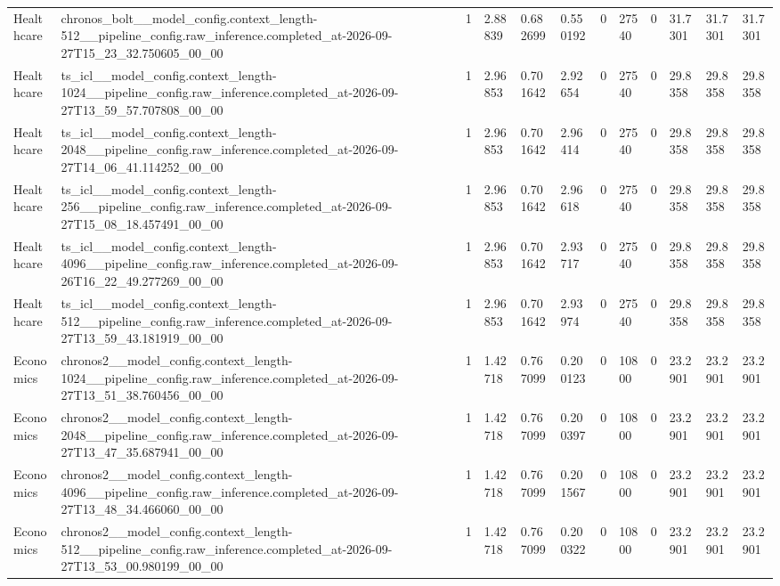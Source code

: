 \begin{tabular}{llllllllllll}
Healthcare & chronos\_bolt\_\_model\_config.context\_length-512\_\_pipeline\_config.raw\_inference.completed\_at-2026-09-27T15\_23\_32.750605\_00\_00 & 1 & 2.88839 & 0.682699 & 0.550192 & 0 & 27540 & 0 & 31.7301 & 31.7301 & 31.7301 \\
Healthcare & ts\_icl\_\_model\_config.context\_length-1024\_\_pipeline\_config.raw\_inference.completed\_at-2026-09-27T13\_59\_57.707808\_00\_00 & 1 & 2.96853 & 0.701642 & 2.92654 & 0 & 27540 & 0 & 29.8358 & 29.8358 & 29.8358 \\
Healthcare & ts\_icl\_\_model\_config.context\_length-2048\_\_pipeline\_config.raw\_inference.completed\_at-2026-09-27T14\_06\_41.114252\_00\_00 & 1 & 2.96853 & 0.701642 & 2.96414 & 0 & 27540 & 0 & 29.8358 & 29.8358 & 29.8358 \\
Healthcare & ts\_icl\_\_model\_config.context\_length-256\_\_pipeline\_config.raw\_inference.completed\_at-2026-09-27T15\_08\_18.457491\_00\_00 & 1 & 2.96853 & 0.701642 & 2.96618 & 0 & 27540 & 0 & 29.8358 & 29.8358 & 29.8358 \\
Healthcare & ts\_icl\_\_model\_config.context\_length-4096\_\_pipeline\_config.raw\_inference.completed\_at-2026-09-26T16\_22\_49.277269\_00\_00 & 1 & 2.96853 & 0.701642 & 2.93717 & 0 & 27540 & 0 & 29.8358 & 29.8358 & 29.8358 \\
Healthcare & ts\_icl\_\_model\_config.context\_length-512\_\_pipeline\_config.raw\_inference.completed\_at-2026-09-27T13\_59\_43.181919\_00\_00 & 1 & 2.96853 & 0.701642 & 2.93974 & 0 & 27540 & 0 & 29.8358 & 29.8358 & 29.8358 \\
Economics & chronos2\_\_model\_config.context\_length-1024\_\_pipeline\_config.raw\_inference.completed\_at-2026-09-27T13\_51\_38.760456\_00\_00 & 1 & 1.42718 & 0.767099 & 0.200123 & 0 & 10800 & 0 & 23.2901 & 23.2901 & 23.2901 \\
Economics & chronos2\_\_model\_config.context\_length-2048\_\_pipeline\_config.raw\_inference.completed\_at-2026-09-27T13\_47\_35.687941\_00\_00 & 1 & 1.42718 & 0.767099 & 0.200397 & 0 & 10800 & 0 & 23.2901 & 23.2901 & 23.2901 \\
Economics & chronos2\_\_model\_config.context\_length-4096\_\_pipeline\_config.raw\_inference.completed\_at-2026-09-27T13\_48\_34.466060\_00\_00 & 1 & 1.42718 & 0.767099 & 0.201567 & 0 & 10800 & 0 & 23.2901 & 23.2901 & 23.2901 \\
Economics & chronos2\_\_model\_config.context\_length-512\_\_pipeline\_config.raw\_inference.completed\_at-2026-09-27T13\_53\_00.980199\_00\_00 & 1 & 1.42718 & 0.767099 & 0.200322 & 0 & 10800 & 0 & 23.2901 & 23.2901 & 23.2901 \\

\end{tabular}
